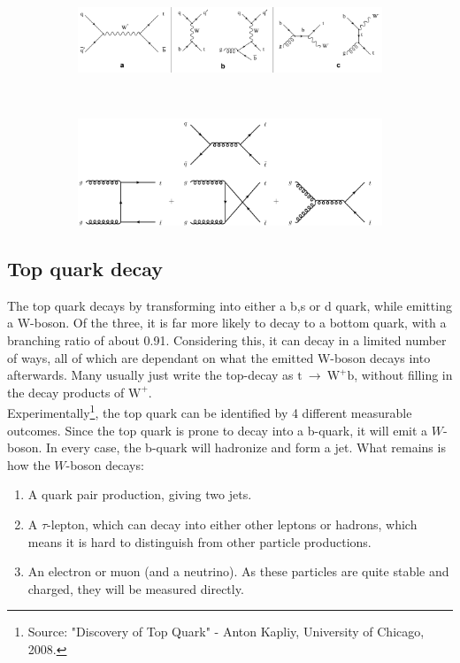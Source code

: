 \documentclass[11pt,a4paper]{article}
\begin{document}
\begin{figure}[h]
	\centering
	\begin{subfigure}[h]{1\textwidth}
		\includegraphics[width=\textwidth]{single_Top_channels_0.jpg}
		\label{Top_single}
	\end{subfigure}
	~
	\begin{subfigure}[h]{1\textwidth}
		\includegraphics[width=\textwidth]{top_pair_production.png}
		\label{Top_pair}
	\end{subfigure}
\end{figure}

\subsection{Top quark decay}
The top quark decays by transforming into either a b,s or d quark, while emitting a W-boson. Of the three, it is far more likely to decay to a bottom quark, with a branching ratio of about 0.91. Considering this, it can decay in a limited number of ways, all of which are dependant on what the emitted W-boson decays into afterwards. Many usually just write the top-decay as $\text{t} \:\rightarrow\: \text{W}^+\text{b}$, without filling in the decay products of $\text{W}^+$.\\

Experimentally\footnote{Source: "Discovery of Top Quark" - Anton Kapliy, University of Chicago, 2008.}, the top quark can be identified by 4 different measurable outcomes. Since the top quark is prone to decay into a b-quark, it will emit a $W$-boson. In every case, the b-quark will hadronize and form a jet. What remains is how the $W$-boson decays:

\begin{enumerate}
	\item A quark pair production, giving two jets.
	\item A $\tau$-lepton, which can decay into either other leptons or hadrons, which means it is hard to distinguish from other particle productions.
	\item An electron or muon (and a neutrino). As these particles are quite stable and charged, they will be measured directly.
\end{enumerate}
\end{document}
